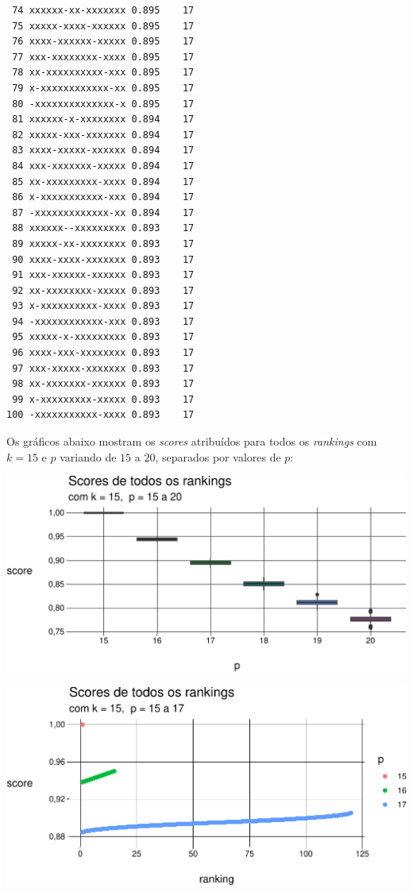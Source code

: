 \documentclass[
  letterpaper,
  DIV=11,
  numbers=noendperiod]{scrreprt}
\begin{document}
\begin{verbatim}
 74 xxxxxx-xx-xxxxxxx 0.895    17
 75 xxxxx-xxxx-xxxxxx 0.895    17
 76 xxxx-xxxxxx-xxxxx 0.895    17
 77 xxx-xxxxxxxx-xxxx 0.895    17
 78 xx-xxxxxxxxxx-xxx 0.895    17
 79 x-xxxxxxxxxxxx-xx 0.895    17
 80 -xxxxxxxxxxxxxx-x 0.895    17
 81 xxxxxx-x-xxxxxxxx 0.894    17
 82 xxxxx-xxx-xxxxxxx 0.894    17
 83 xxxx-xxxxx-xxxxxx 0.894    17
 84 xxx-xxxxxxx-xxxxx 0.894    17
 85 xx-xxxxxxxxx-xxxx 0.894    17
 86 x-xxxxxxxxxxx-xxx 0.894    17
 87 -xxxxxxxxxxxxx-xx 0.894    17
 88 xxxxxx--xxxxxxxxx 0.893    17
 89 xxxxx-xx-xxxxxxxx 0.893    17
 90 xxxx-xxxx-xxxxxxx 0.893    17
 91 xxx-xxxxxx-xxxxxx 0.893    17
 92 xx-xxxxxxxx-xxxxx 0.893    17
 93 x-xxxxxxxxxx-xxxx 0.893    17
 94 -xxxxxxxxxxxx-xxx 0.893    17
 95 xxxxx-x-xxxxxxxxx 0.893    17
 96 xxxx-xxx-xxxxxxxx 0.893    17
 97 xxx-xxxxx-xxxxxxx 0.893    17
 98 xx-xxxxxxx-xxxxxx 0.893    17
 99 x-xxxxxxxxx-xxxxx 0.893    17
100 -xxxxxxxxxxx-xxxx 0.893    17
\end{verbatim}

Os gráficos abaixo mostram os \emph{scores} atribuídos para todos os
\emph{rankings} com $k = 15$ e $p$ variando de $15$ a $20$, separados
por valores de $p$:

\begin{center}
\includegraphics[width=1\textwidth,height=\textheight]{usando-posicoes_files/figure-pdf/unnamed-chunk-6-1.pdf}
\end{center}

\begin{center}
\includegraphics[width=1\textwidth,height=\textheight]{usando-posicoes_files/figure-pdf/unnamed-chunk-7-1.pdf}
\end{center}
\end{document}

